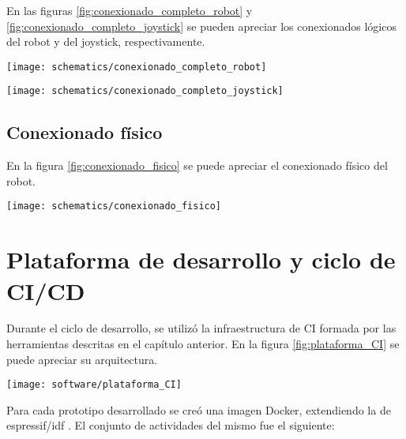 En las figuras \ref{fig:conexionado_completo_robot} y \ref{fig:conexionado_completo_joystick} se pueden apreciar los conexionados lógicos del robot y del joystick, respectivamente.

\begin{center}
\texttt{[image: schematics/conexionado\_completo\_robot]}
  \label{fig:conexionado_completo_robot}
\end{center}


\begin{center}
\texttt{[image: schematics/conexionado\_completo\_joystick]}
  \label{fig:conexionado_completo_joystick}
\end{center}


\subsection{Conexionado físico}

En la figura \ref{fig:conexionado_fisico} se puede apreciar el conexionado físico del robot.

\begin{center}
\texttt{[image: schematics/conexionado\_fisico]}
  \label{fig:conexionado_fisico}
\end{center}

\vspace{2cm}



\section{Plataforma de desarrollo y ciclo de CI/CD}

Durante el ciclo de desarrollo, se utilizó la infraestructura de CI formada por las herramientas descritas en el capítulo anterior. En la figura \ref{fig:plataforma_CI} se puede apreciar su arquitectura.

\begin{center}
   \texttt{[image: software/plataforma\_CI]}
   \label{fig:plataforma_CI}
\end{center}

Para cada prototipo desarrollado se creó una imagen Docker, extendiendo la de espressif/idf \cite{Espressif_docker_image}. El conjunto de actividades del mismo fue el siguiente:

